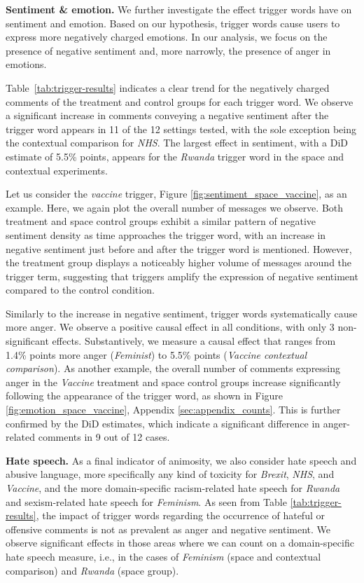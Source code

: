 \noindent\textbf{Sentiment \& emotion.}
We further investigate the effect trigger words have on sentiment and emotion. Based on our hypothesis, trigger words cause users to express more negatively charged emotions. In our analysis, we focus on the presence of negative sentiment and, more narrowly, the presence of anger in emotions.  

Table~\ref{tab:trigger-results} indicates a clear trend for the negatively charged comments of the treatment and control groups for each trigger word. We observe a significant increase in comments conveying a negative sentiment after the trigger word appears in 11 of the 12 settings tested, with the sole exception being the contextual comparison for \textit{NHS}. The largest effect in sentiment, with a DiD estimate of 5.5\% points, appears for the \textit{Rwanda} trigger word in the space and contextual experiments.

Let us consider the \textit{vaccine} trigger, Figure \ref{fig:sentiment_space_vaccine}, as an example. Here, we again plot the overall number of messages we observe. Both treatment and space control groups exhibit a similar pattern of negative sentiment density as time approaches the trigger word, with an increase in negative sentiment just before and after the trigger word is mentioned. %
However, the treatment group displays a noticeably higher volume of messages around the trigger term, suggesting that triggers amplify the expression of negative sentiment compared to the control condition.

Similarly to the increase in negative sentiment, trigger words systematically cause more anger. We observe a positive causal effect in all conditions, with only 3 non-significant effects. Substantively, we measure a causal effect that ranges from 1.4\% points more anger (\textit{Feminist}) to 5.5\% points (\textit{Vaccine contextual comparison}). As another example, the overall number of comments expressing anger in the \textit{Vaccine} treatment and space control groups increase significantly following the appearance of the trigger word, as shown in Figure \ref{fig:emotion_space_vaccine}, Appendix \ref{sec:appendix_counts}. This is further confirmed by the DiD estimates, which indicate a significant difference in anger-related comments in 9 out of 12 cases.

\noindent\textbf{Hate speech.}
As a final indicator of animosity, we also consider hate speech and abusive language, more specifically any kind of toxicity for \textit{Brexit}, \textit{NHS}, and \textit{Vaccine}, and the more domain-specific racism-related hate speech for \textit{Rwanda} and sexism-related hate speech for \textit{Feminism}. As seen from Table \ref{tab:trigger-results}, the impact of trigger words regarding the occurrence of hateful or offensive comments is not as prevalent as anger and negative sentiment. We observe significant effects in those areas where we can count on a domain-specific hate speech measure, i.e., in the cases of \textit{Feminism} (space and contextual comparison) and \textit{Rwanda} (space group).

